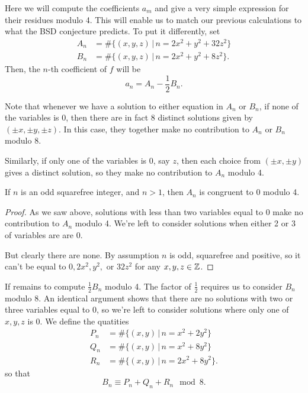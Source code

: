 \documentclass[12pt, a4paper]{report}
\begin{document}
Here we will compute the coefficients $a_m$ and give a very simple expression for
their residues modulo 4. This will enable us to match our previous calculations
to what the BSD conjecture predicts.
To put it differently, set
\begin{equation*}
  \begin{split}
    A_n &= \#\{(x,y,z) \,|\, n = 2x^2 + y^2 + 32z^2\} \\
    B_n &= \#\{(x,y,z) \,|\, n = 2x^2 + y^2 + 8z^2\}.
  \end{split}
\end{equation*}
Then, the $n$-th coefficient of $f$ will be
\[a_n = A_n - \frac{1}{2}B_n.\]

Note that whenever we have a solution to either equation in $A_n$ or $B_n$,
if none of the variables is 0, then there are in fact 8 distinct
solutions given by $(\pm x, \pm y, \pm z)$.
In this case, they together make no contribution to $A_n$ or $B_n$ modulo 8.

Similarly, if only one of the variables is 0, say $z$, then each choice from
$(\pm x, \pm y)$ gives a distinct solution, so they make no contribution
to $A_n$ modulo 4.

\begin{lemma}
  If $n$ is an odd squarefree integer, and $n > 1$,
  then $A_n$ is congruent to 0 modulo 4.
\end{lemma}
\begin{proof}
  As we saw above, solutions with less than two variables equal to 0 make no
  contribution to $A_n$ modulo 4. We're left to consider solutions when
  either 2 or 3 of variables are are 0.

  But clearly there are none. By assumption $n$ is odd, squarefree and
  positive, so it can't be equal to $0, 2x^2, y^2, $ or $32z^2$ for
  any $x,y,z \in {\mathbb Z}$.
\end{proof}

If remains to compute $\frac{1}{2}B_n$ modulo 4. The factor of $\frac{1}{2}$
requires us to consider $B_n$ modulo 8.
An identical argument shows that there are no solutions with two or three
variables
equal to 0, so
we're left to consider solutions where only one of $x,y,z$ is 0.
We define the quatities
\[
  \begin{split}
    P_n &= \#\{(x,y) \,|\, n = x^2 + 2y^2\} \\
    Q_n &= \#\{(x,y) \,|\, n = x^2 + 8y^2\} \\
    R_n &= \#\{(x,y) \,|\, n = 2x^2 + 8y^2\}.
  \end{split}
\]
so that
\[
  B_n \equiv P_n + Q_n + R_n \mod{8}.
\]
\end{document}
